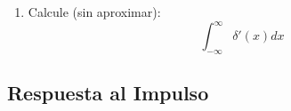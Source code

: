 \documentclass[letterpaper, 12pt]{article}
\newif\ifanswers
\begin{document}
\begin{enumerate}
 
    \item Calcule (sin aproximar):
    $$\int_{-\infty}^{\infty}\delta'(x)dx$$
        \ifanswers
        {\color{red}\\
        \textbf{Solución:}
        Podemos reescribir la integral como una convolución convenientemente:
        $$\int_{-\infty}^{\infty}\delta'(x)\cdot1(t-x)dx$$
        
        Luego sabemos que $h'(t) = {f'*g}(t) = {f*g'}(t)$. Por lo tanto:
        $$\int_{-\infty}^{\infty}\delta'(x)dx = \int_{-\infty}^{\infty}\delta(x)\cdot1'(t-x)dx$$

        Dado que la función uno es constante su derivada es cero, por lo que se obtiene:
        $$\int_{-\infty}^{\infty}\delta'(x)dx = \int_{-\infty}^{\infty}\delta(x)\cdot0dx = 0$$
        }
    \fi

    \end{enumerate}

\subsection*{Respuesta al Impulso}
\end{document}
